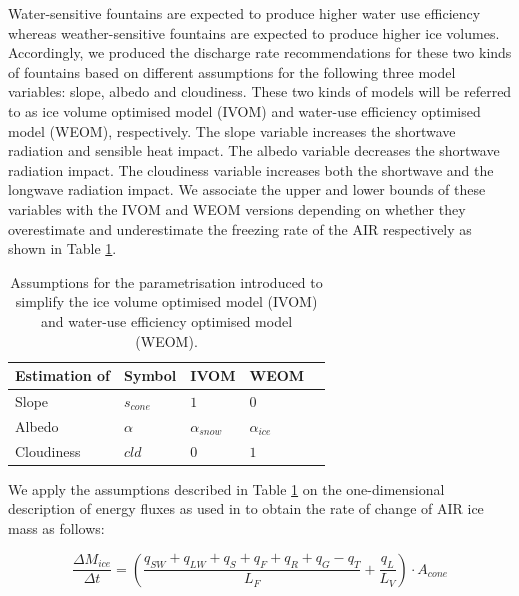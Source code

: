 \documentclass[tc, manuscript]{copernicus}
\begin{document}
Water-sensitive fountains are expected to produce higher water use efficiency whereas weather-sensitive
fountains are expected to produce higher ice volumes. Accordingly, we produced the discharge rate
recommendations for these two kinds of fountains based on different assumptions for the following three model
variables: slope, albedo and cloudiness.  These two kinds of models will be referred to as ice volume optimised
model (IVOM) and water-use efficiency optimised model (WEOM), respectively. The slope variable increases the
shortwave radiation and sensible heat impact. The albedo variable decreases the shortwave radiation impact. The
cloudiness variable increases both the shortwave and the longwave radiation impact. We associate the upper and
lower bounds of these variables with the IVOM and WEOM versions depending on whether they overestimate and
underestimate the freezing rate of the AIR respectively as shown in Table \ref{tab:assumptions}.

\begin{table}[]
\centering
\caption{Assumptions for the parametrisation introduced to simplify the ice volume optimised model (IVOM) and
water-use efficiency optimised model (WEOM).}
\label{tab:assumptions}
\begin{tabular}{@{}lllll@{}}
\toprule
\textbf{Estimation of} & \textbf{Symbol} & \textbf{IVOM} & \textbf{WEOM} & \\ \midrule
\multicolumn{1}{|l}{Slope}        & $s_{cone}$ & $ 1 $ & $0$ & \multicolumn{1}{l|}{} \\ \midrule
\multicolumn{1}{|l}{Albedo} & $\alpha$ & $\alpha_{snow}$ & $\alpha_{ice}$ & \multicolumn{1}{l|}{} \\\midrule 
\multicolumn{1}{|l}{Cloudiness}  & $cld$ & $0$ & $1$ & \multicolumn{1}{l|}{} \\ \bottomrule
\end{tabular}
\end{table}

We apply the assumptions described in Table \ref{tab:assumptions} on the one-dimensional description of energy
fluxes as used in \cite{balasubramanianInfluenceMeteorologicalConditions2022} to obtain the rate of change of
AIR ice mass as follows: 

\begin{equation}
  \frac{\Delta M_{ice}}{\Delta t}  =  (\frac{q_{SW} + q_{LW} + q_{S} + q_{F} + q_{R} + q_{G} - q_{T}}{L_F} + \frac{q_{L}}{L_V} ) \cdot A_{cone}
	\label{eqn:auto}
\end{equation}
\end{document}
